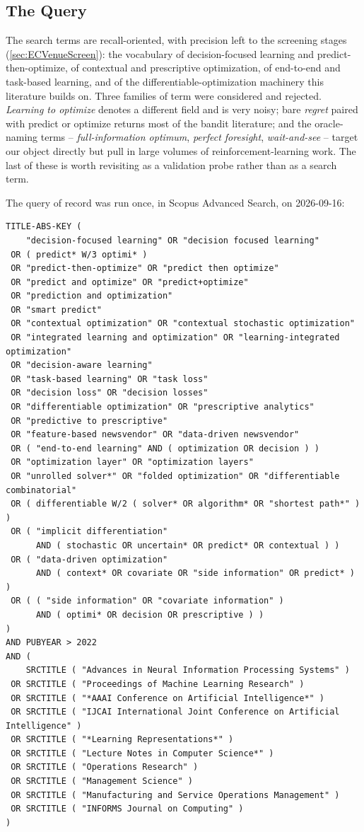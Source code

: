 \subsection{The Query}

The search terms are recall-oriented, with precision left to the screening stages
(\cref{sec:ECVenueScreen}): the vocabulary of decision-focused learning and predict-then-optimize,
of contextual and prescriptive optimization, of end-to-end and task-based learning, and of the
differentiable-optimization machinery this literature builds on. Three families of term were
considered and rejected. \emph{Learning to optimize} denotes a different field and is very noisy;
bare \emph{regret} paired with predict or optimize returns most of the bandit literature; and the
oracle-naming terms -- \emph{full-information optimum}, \emph{perfect foresight}, \emph{wait-and-see}
-- target our object directly but pull in large volumes of reinforcement-learning work. The last of
these is worth revisiting as a validation probe rather than as a search term.

The query of record was run once, in Scopus Advanced Search, on 2026-09-16:

\begin{verbatim}
TITLE-ABS-KEY (
    "decision-focused learning" OR "decision focused learning"
 OR ( predict* W/3 optimi* )
 OR "predict-then-optimize" OR "predict then optimize"
 OR "predict and optimize" OR "predict+optimize"
 OR "prediction and optimization"
 OR "smart predict"
 OR "contextual optimization" OR "contextual stochastic optimization"
 OR "integrated learning and optimization" OR "learning-integrated optimization"
 OR "decision-aware learning"
 OR "task-based learning" OR "task loss"
 OR "decision loss" OR "decision losses"
 OR "differentiable optimization" OR "prescriptive analytics"
 OR "predictive to prescriptive"
 OR "feature-based newsvendor" OR "data-driven newsvendor"
 OR ( "end-to-end learning" AND ( optimization OR decision ) )
 OR "optimization layer" OR "optimization layers"
 OR "unrolled solver*" OR "folded optimization" OR "differentiable combinatorial"
 OR ( differentiable W/2 ( solver* OR algorithm* OR "shortest path*" ) )
 OR ( "implicit differentiation"
      AND ( stochastic OR uncertain* OR predict* OR contextual ) )
 OR ( "data-driven optimization"
      AND ( context* OR covariate OR "side information" OR predict* ) )
 OR ( ( "side information" OR "covariate information" )
      AND ( optimi* OR decision OR prescriptive ) )
)
AND PUBYEAR > 2022
AND (
    SRCTITLE ( "Advances in Neural Information Processing Systems" )
 OR SRCTITLE ( "Proceedings of Machine Learning Research" )
 OR SRCTITLE ( "*AAAI Conference on Artificial Intelligence*" )
 OR SRCTITLE ( "IJCAI International Joint Conference on Artificial Intelligence" )
 OR SRCTITLE ( "*Learning Representations*" )
 OR SRCTITLE ( "Lecture Notes in Computer Science*" )
 OR SRCTITLE ( "Operations Research" )
 OR SRCTITLE ( "Management Science" )
 OR SRCTITLE ( "Manufacturing and Service Operations Management" )
 OR SRCTITLE ( "INFORMS Journal on Computing" )
)
\end{verbatim}

